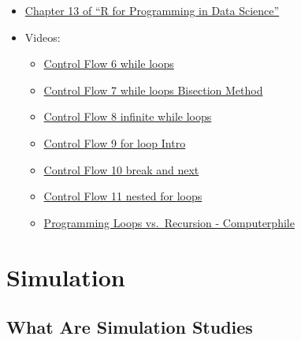 \documentclass[
]{book}
\providecommand{\tightlist}{%
  \setlength{\itemsep}{0pt}\setlength{\parskip}{0pt}}
\begin{document}
\begin{itemize}
\tightlist
\item
  \href{https://bookdown.org/rdpeng/rprogdatascience/functions.html\#the-...-argument}{Chapter 13 of ``R for Programming in Data Science''}
\item
  Videos:

  \begin{itemize}
  \tightlist
  \item
    \href{https://ucr.yuja.com/V/Video?v=2369000\&node=8488272\&a=151697133\&autoplay=1}{Control Flow 6 \textbar{} while loops}
  \item
    \href{https://ucr.yuja.com/V/Video?v=2368999\&node=8488271\&a=621919520\&autoplay=1}{Control Flow 7 \textbar{} while loops Bisection Method}
  \item
    \href{https://ucr.yuja.com/V/Video?v=2368998\&node=8488270\&a=1160986069\&autoplay=1}{Control Flow 8 \textbar{} infinite while loops}
  \item
    \href{https://ucr.yuja.com/V/Video?v=2368997\&node=8488269\&a=148930850\&autoplay=1}{Control Flow 9 \textbar{} for loop Intro}
  \item
    \href{https://ucr.yuja.com/V/Video?v=2368996\&node=8488268\&a=160173707\&autoplay=1}{Control Flow 10 \textbar{} break and next}
  \item
    \href{https://ucr.yuja.com/V/Video?v=2368995\&node=8488267\&a=316843892\&autoplay=1}{Control Flow 11 \textbar{} nested for loops}
  \item
    \href{https://www.youtube.com/watch?v=HXNhEYqFo0o}{Programming Loops vs.~Recursion - Computerphile}
  \end{itemize}
\end{itemize}

\hypertarget{simulation}{%
\chapter{Simulation}\label{simulation}}

\hypertarget{what-are-simulation-studies}{%
\section{What Are Simulation Studies}\label{what-are-simulation-studies}}
\end{document}
